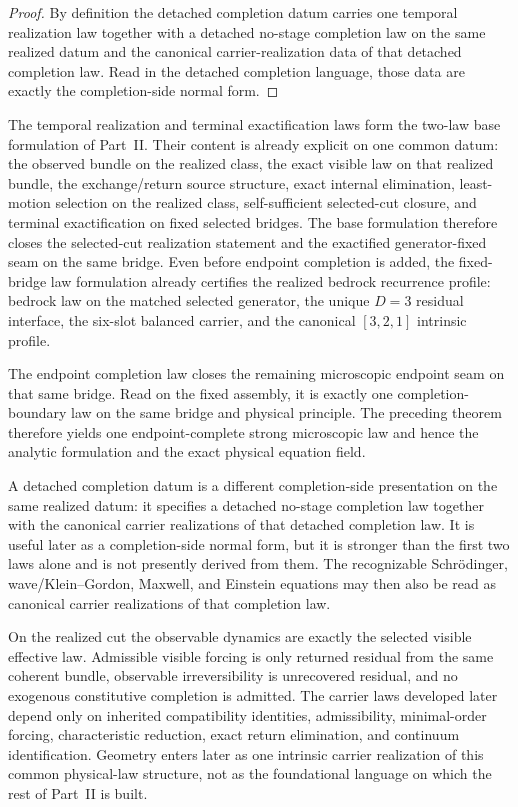 \begin{proof}
By definition the detached completion datum carries one temporal realization
law together with a detached no-stage completion law on the same realized
datum and the canonical carrier-realization data of that detached completion
law.
Read in the detached completion language, those data are exactly the
completion-side normal form.
\end{proof}

The temporal realization and terminal exactification laws form the
two-law base formulation of Part~II. Their content is already explicit on
one common datum: the observed bundle on the realized class, the exact
visible law on that realized bundle, the exchange/return source structure,
exact internal elimination, least-motion selection on the realized class, self-sufficient
selected-cut closure, and terminal exactification on fixed selected bridges.
The base formulation therefore closes the selected-cut realization statement
and the exactified generator-fixed seam on the same bridge. Even before
endpoint completion is added, the fixed-bridge law formulation already
certifies the realized bedrock recurrence profile: bedrock law on the matched
selected generator, the unique \(D=3\) residual interface, the
six-slot balanced carrier, and the canonical \([3,2,1]\) intrinsic profile.

The endpoint completion law closes the remaining microscopic endpoint seam on
that same bridge. Read on the fixed assembly, it is exactly one
completion-boundary law on the same bridge and physical principle. The
preceding theorem therefore yields one endpoint-complete strong microscopic
law and hence the analytic formulation and the exact physical equation field.

A detached completion datum is a different completion-side presentation on the
same realized datum: it specifies a detached no-stage completion law together
with the canonical carrier realizations of that detached completion law. It is
useful later as a completion-side normal form, but it is stronger than the
first two laws alone and is not presently derived from them. The recognizable
Schr\"odinger, wave/Klein--Gordon, Maxwell, and Einstein equations may then
also be read as canonical carrier realizations of that completion law.

On the realized cut the observable dynamics are exactly the selected visible
effective law. Admissible visible forcing is only returned residual from the
same coherent bundle, observable irreversibility is unrecovered residual, and
no exogenous constitutive completion is admitted. The carrier laws developed
later depend only on inherited compatibility identities, admissibility,
minimal-order forcing, characteristic reduction, exact return elimination, and
continuum identification. Geometry enters later as one intrinsic carrier
realization of this common physical-law structure, not as the foundational
language on which the rest of Part~II is built.

